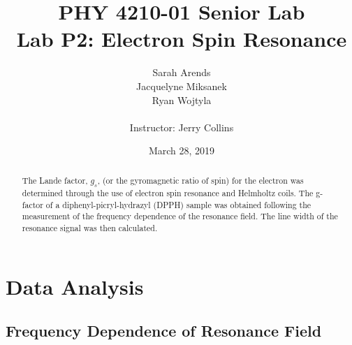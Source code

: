 \documentclass[a4paper]{article}
\title{PHY 4210-01 Senior Lab \\Lab P2: Electron Spin Resonance}
\author{Sarah Arends \\ 
        Jacquelyne Miksanek \\
        Ryan Wojtyla \\ \\
        Instructor: Jerry Collins}
\date{March 28, 2019}
\begin{document}
\maketitle 

\begin{abstract}

\qq The Lande factor, $g_s$, (or the gyromagnetic ratio of spin) for the
electron was determined through the use of electron spin resonance and
Helmholtz coils. The g-factor of a diphenyl-picryl-hydrazyl (DPPH) sample was
obtained following the measurement of the frequency dependence of the
resonance field. The line width of the resonance signal was then calculated.

\end{abstract}

\newpage

\tableofcontents

\newpage

\section{Data Analysis}
\subsection{Frequency Dependence of Resonance Field}
\end{document}
